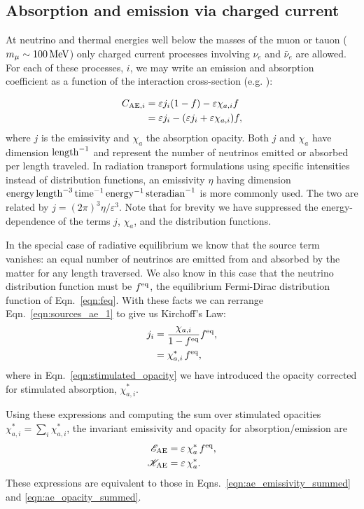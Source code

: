 \documentclass[aps,floatfix,prd,superscriptaddress,twocolumn]{revtex4-1}
\newcommand{\todo}[1]{\marginpar{\tiny{\textcolor{red}{#1}}}}
\renewcommand\todo[1]{} %
\begin{document}
\subsection{Absorption and emission via charged current}
\label{ssec:sources_ae}
At neutrino and thermal energies well below the masses of the muon or tauon
($m_{\mu}\sim100\,{\rm MeV}$)
only charged current processes involving $\nu_e$ and $\bar{\nu}_e$ are allowed.
For each of these processes, $i$, we may write an emission and absorption
coefficient as a function of the interaction cross-section
(e.g. \cite[Eqn.~A5]{brue1985-core_collapse}):
\todo{explain Fermi-blocking}
\begin{align}
  \label{eqn:sources_ae_1}
  C_{{\rm AE},i}
  &= \varepsilon j_i (1-f) - \varepsilon \chi_{a,i} f \\
  \label{eqn:sources_ae_2}
  &= \varepsilon j_i - (\varepsilon j_i+\varepsilon \chi_{a,i}) f,
\end{align}
where $j$ is the emissivity and $\chi_a$ the absorption opacity.
Both $j$ and $\chi_a$ have dimension ${\rm length}^{-1}$ and represent the
number of neutrinos emitted or absorbed per length traveled.
In radiation transport formulations using specific intensities instead of
distribution functions, an emissivity $\eta$ having dimension
${\rm energy}\,{\rm length}^{-3}\,{\rm time}^{-1}\,{\rm energy}^{-1}\,{\rm steradian}^{-1}$
is more commonly used.
The two are related by $j=(2\pi)^3\eta/\varepsilon^3$.
Note that for brevity we have suppressed the energy-dependence of
the terms $j$, $\chi_a$, and the distribution functions.

In the special case of radiative equilibrium we know that the source
term vanishes: an equal number of neutrinos are emitted from
and absorbed by the matter for any length traversed.
We also know in this case that the neutrino distribution function must be
$f^{\rm eq}$, the equilibrium Fermi-Dirac distribution function of
Eqn.~\ref{eqn:feq}.
With these facts we can rerrange Eqn.~\ref{eqn:sources_ae_1} to give us
Kirchoff's Law:
\begin{align}
  \label{eqn:kirchoffs_law}
  j_i &= \frac{\chi_{a,i}}{1-f^{\rm eq}}f^{\rm eq}, \\
  \label{eqn:stimulated_opacity}
  &= \chi^*_{a,i}\,f^{\rm eq},
\end{align}
where in Eqn.~\ref{eqn:stimulated_opacity} we have introduced the opacity
corrected for stimulated absorption, $\chi^*_{a,i}$.

Using these expressions and computing the sum over stimulated opacities
$\chi^*_{a,i}=\sum_i \chi^*_{a,i}$,
the invariant emissivity and opacity for absorption/emission are
\begin{align}
  \label{eqn:ae_emissivity_summed_2}
  \mathscr{E}_{{\rm AE}} &= \varepsilon \, \chi^*_a \, f^{\rm eq}, \\
  \label{eqn:ae_opacity_summed_2}
  \mathscr{K}_{{\rm AE}} &= \varepsilon \, \chi^*_a.
\end{align}
These expressions are equivalent to those in
Eqns.~\ref{eqn:ae_emissivity_summed} and \ref{eqn:ae_opacity_summed}.
\end{document}
